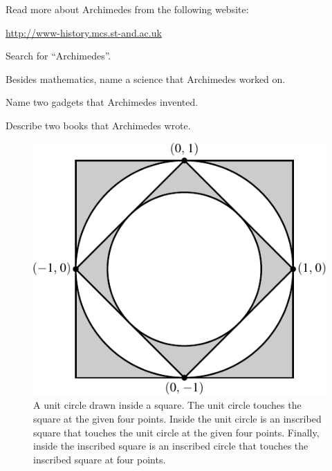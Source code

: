 \documentclass[a4paper,oneside,12pt]{article}
\begin{document}
\begin{problem}
\item Read more about Archimedes from the following website:
  \begin{center}
  \url{http://www-history.mcs.st-and.ac.uk}
  \end{center}
  Search for ``Archimedes''.
  \begin{packedenum}
  \item Besides mathematics, name a science that Archimedes worked
    on.

  \item Name two gadgets that Archimedes invented.

  \item Describe two books that Archimedes wrote.
  \end{packedenum}

\begin{figure}[!htbp]
\centering
\includegraphics[scale=1]{image/05/square-inscribed-circle.pdf}
\caption{%
  A unit circle drawn inside a square.  The unit circle touches the
  square at the given four points.  Inside the unit circle is an
  inscribed square that touches the unit circle at the given four
  points.  Finally, inside the inscribed square is an inscribed circle
  that touches the inscribed square at four points.
}
\label{fig:square_inscribed_circle}
\end{figure}


\end{problem}
\end{document}
